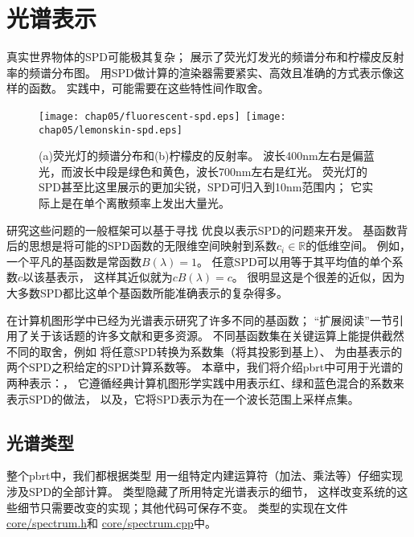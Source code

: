 \section{光谱表示}\label{sec:光谱表示}

真实世界物体的SPD可能极其复杂；
展示了荧光灯发光的频谱分布和柠檬皮反射率的频谱分布图。
用SPD做计算的渲染器需要紧实、高效且准确的方式表示像这样的函数。
实践中，可能需要在这些特性间作取舍。
\begin{figure}[htbp]
    \centering
    \texttt{[image: chap05/fluorescent-spd.eps]}\,\nolinebreak
    \texttt{[image: chap05/lemonskin-spd.eps]}
    \caption{(a)荧光灯的频谱分布和(b)柠檬皮的反射率。
        波长400nm左右是偏蓝光，而波长中段是绿色和黄色，波长700nm左右是红光。
        荧光灯的SPD甚至比这里展示的更加尖锐，SPD可归入到10nm范围内；
        它实际上是在单个离散频率上发出大量光。}
    \label{fig:5.1}
\end{figure}

研究这些问题的一般框架可以基于寻找
优良以表示SPD的问题来开发。
基函数背后的思想是将可能的SPD函数的无限维空间映射到系数$c_i\in\mathbb{R}$的低维空间。
例如，一个平凡的基函数是常函数$B(\lambda)=1$。
任意SPD可以用等于其平均值的单个系数$c$以该基表示，
这样其近似就为$cB(\lambda)=c$。
很明显这是个很差的近似，因为大多数SPD都比这单个基函数所能准确表示的复杂得多。

在计算机图形学中已经为光谱表示研究了许多不同的基函数；
“扩展阅读”一节引用了关于该话题的许多文献和更多资源。
不同基函数集在关键运算上能提供截然不同的取舍，例如
将任意SPD转换为系数集（将其投影到基上）、
为由基表示的两个SPD之积给定的SPD计算系数等。
本章中，我们将介绍pbrt中可用于光谱的两种表示：，
它遵循经典计算机图形学实践中用表示红、绿和蓝色混合的系数来表示SPD的做法，
以及，它将SPD表示为在一个波长范围上采样点集。

\subsection{光谱类型}\label{sub:光谱类型}
整个pbrt中，我们都根据类型
用一组特定内建运算符（加法、乘法等）仔细实现涉及SPD的全部计算。
类型隐藏了所用特定光谱表示的细节，
这样改变系统的这些细节只需要改变的实现；其他代码可保存不变。
类型的实现在文件\href{https://github.com/mmp/pbrt-v3/blob/master/src/core/spectrum.h}{\ttfamily core/spectrum.h}和
\href{https://github.com/mmp/pbrt-v3/blob/master/src/core/spectrum.cpp}{\ttfamily core/spectrum.cpp}中。

